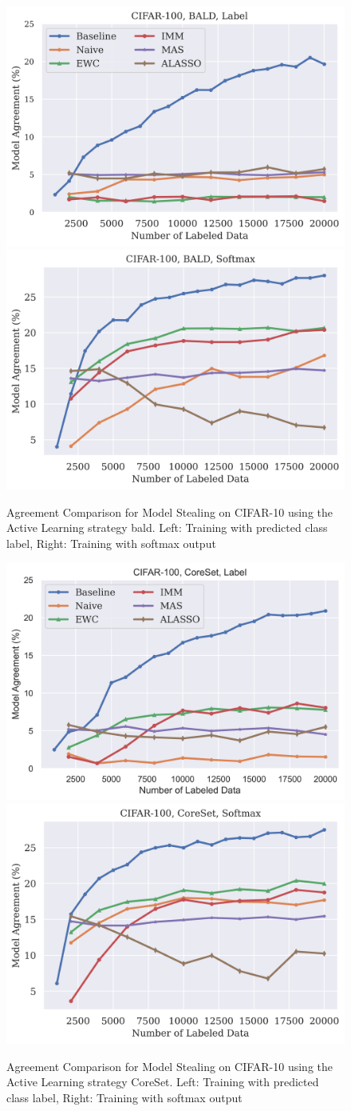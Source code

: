\begin{figure}[!htb]
    \centering
    \includegraphics[width=0.48\linewidth]{images/results_CALMS/cifar100_label_bald.png} \hfill
    \includegraphics[width=0.48\linewidth]{images/results_CALMS/cifar100_softmax_bald.png}
    \caption{Agreement Comparison for Model Stealing on CIFAR-10 using the Active Learning strategy \gls{bald}. Left: Training with predicted class label,
    Right: Training with softmax output}
    \label{fig:CALMSCIFAR10BALD}
\end{figure}

\begin{figure}[!htb]
    \centering
    \includegraphics[width=0.48\linewidth]{images/results_CALMS/cifar100_label_coreset.png} \hfill
    \includegraphics[width=0.48\linewidth]{images/results_CALMS/cifar100_softmax_coreset.png}
    \caption{Agreement Comparison for Model Stealing on CIFAR-10 using the Active Learning strategy CoreSet. Left: Training with predicted class label,
    Right: Training with softmax output}
    \label{fig:CALMSCIFAR10CoreSet}
\end{figure}

